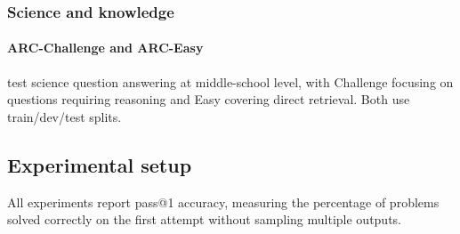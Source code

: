 \documentclass[11pt]{article}
\begin{document}
\subsubsection{Science and knowledge}
\paragraph{ARC-Challenge and ARC-Easy} \citep{clark2018arc} test science question answering at middle-school level, with Challenge focusing on questions requiring reasoning and Easy covering direct retrieval. Both use train/dev/test splits.

\subsection{Experimental setup}

All experiments report pass@1 accuracy, measuring the percentage of problems solved correctly on the first attempt without sampling multiple outputs.
\end{document}
